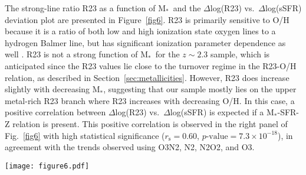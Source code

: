 \documentclass[iop,twocolappendix]{emulateapj}
\newcommand{\mstar}{$\mbox{M}_*$}
\begin{document}
The strong-line ratio R23 as a function of \mstar\ and the $\Delta$log(R23) vs.~$\Delta$log(sSFR)
 deviation plot are presented in Figure~\ref{fig6}.
  R23 is primarily sensitive to O/H because it is a ratio of both low and high ionization state oxygen
 lines to a hydrogen Balmer line, but has significant ionization parameter dependence as well \citep{kew02}.
  R23 is not a strong function of \mstar\ for the $z\sim2.3$ sample, which is anticipated since the R23 values lie close
 to the turnover regime in the R23-O/H relation, as described in Section~\ref{sec:metallicities}.
  However, R23 does increase slightly with decreasing \mstar, suggesting that our
 sample mostly lies on the upper metal-rich R23 branch where R23 increases with decreasing O/H.
  In this case, a positive correlation between $\Delta$log(R23) vs.~$\Delta$log(sSFR) is expected if a
 \mstar-SFR-Z relation is present.  This positive correlation is observed in the right panel of Fig.~\ref{fig6}
 with high statistical significance ($r_{\text{s}}=0.60$, $p\mbox{-value}=7.3\times10^{-18}$),
 in agreement with the trends observed using O3N2, N2, N2O2, and O3.

\begin{figure*}
 \texttt{[image: figure6.pdf]}
 \centering
 \caption{\textsc{Left:} The line ratio R23 as a function of \mstar\ for the $z\sim2.3$ and $z\sim0$ samples,
 with points and lines the same as in Figure~\ref{fig2}.
  \textsc{Right:} The deviation plot of $\Delta$log(R23) vs.~$\Delta$log(sSFR/yr$^{-1}$) for $z\sim2.3$
 galaxies, with points the same as in the middle column of Figure~\ref{fig3}.
}\label{fig6}
\end{figure*}
\end{document}
